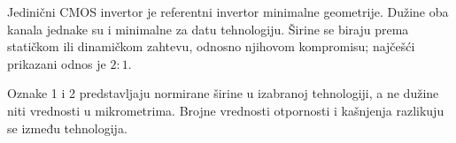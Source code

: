 Jedinični CMOS invertor je referentni invertor minimalne geometrije. Dužine oba kanala jednake su i minimalne za datu tehnologiju. Širine se biraju prema statičkom ili dinamičkom zahtevu, odnosno njihovom kompromisu; najčešći prikazani odnos je $2:1$.

Oznake 1 i 2 predstavljaju normirane širine u izabranoj tehnologiji, a ne dužine niti vrednosti u mikrometrima. Brojne vrednosti otpornosti i kašnjenja razlikuju se između tehnologija.
